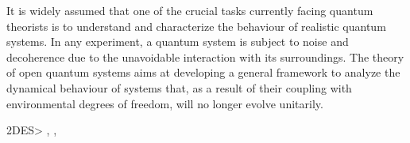 

It is widely assumed that one of the crucial tasks currently facing quantum theorists
is to understand and characterize the behaviour of realistic quantum systems. In
any experiment, a quantum system is subject to noise and decoherence due to the
unavoidable interaction with its surroundings. The theory of open quantum systems
aims at developing a general framework to analyze the dynamical behaviour of systems
that, as a result of their coupling with environmental degrees of freedom, will no
longer evolve unitarily. \cite{Rivas_2010}



2DES> \cite{krumland2023twodimensional}, \cite{Segarra-Martí2018}, \cite{Sun2024}